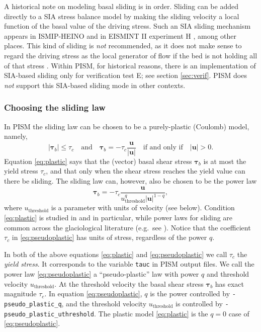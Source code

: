 A historical note on modeling basal sliding is in order.  Sliding can be added directly to a SIA stress balance model by making the sliding velocity a local function of the basal value of the driving stress.  Such an SIA sliding mechanism appears in ISMIP-HEINO \cite{Calovetal2009HEINOfinal} and in EISMINT II experiment H \cite{EISMINT00}, among other places.  This kind of sliding is \emph{not} recommended, as it does not make sense to regard the driving stress as the local generator of flow if the bed is not holding all of that stress \cite{BBssasliding,Fowler01}.  Within PISM, for historical reasons, there is an implementation of SIA-based sliding only for verification test E; see section \ref{sec:verif}.  PISM does \emph{not} support this SIA-based sliding mode in other contexts.

\subsubsection*{Choosing the sliding law}  In PISM the sliding law can be chosen to be a purely-plastic (Coulomb) model, namely,
\begin{equation}
   |\boldsymbol{\tau}_b| \le \tau_c \quad \text{and} \quad \boldsymbol{\tau}_b = - \tau_c \frac{\mathbf{u}}{|\mathbf{u}|} \quad\text{if and only if}\quad |\mathbf{u}| > 0.
\label{eq:plastic}
\end{equation}
Equation \eqref{eq:plastic} says that the (vector) basal shear stress $\boldsymbol{\tau}_b$ is at most the yield stress $\tau_c$, and that only when the shear stress reaches the yield value can there be sliding.  The sliding law can, however, also be chosen to be the power law
\begin{equation}
\boldsymbol{\tau}_b =  - \tau_c \frac{\mathbf{u}}{u_{\text{threshold}}^q |\mathbf{u}|^{1-q}},
\label{eq:pseudoplastic}
\end{equation}
where $u_{\text{threshold}}$ is a parameter with units of velocity (see below).  Condition \eqref{eq:plastic} is studied in \cite{SchoofStream} and \cite{SchoofTill} in particular, while power laws for sliding are common across the glaciological literature (e.g.~see \cite{CuffeyPaterson,GreveBlatter2009}).  Notice that the coefficient $\tau_c$ in \eqref{eq:pseudoplastic} has units of stress, regardless of the power $q$.

In both of the above equations \eqref{eq:plastic} and \eqref{eq:pseudoplastic} we call $\tau_c$ the \emph{yield stress}.  It corresponds to the variable \texttt{tauc} in PISM output files.  We call the power law \eqref{eq:pseudoplastic} a ``pseudo-plastic'' law with power $q$ and threshold velocity $u_{\text{threshold}}$.  At the threshold velocity the basal shear stress $\boldsymbol{\tau}_b$ has exact magnitude $\tau_c$.  In equation \eqref{eq:pseudoplastic}, $q$ is the power controlled by \texttt{-pseudo_plastic_q}, and the threshold velocity $u_{\text{threshold}}$ is controlled by \texttt{-pseudo_plastic_uthreshold}.  The plastic model \eqref{eq:plastic} is the $q=0$ case of \eqref{eq:pseudoplastic}.

